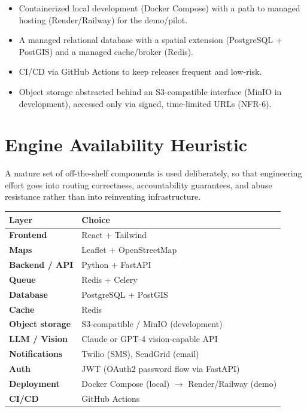 \documentclass[12pt,a4paper]{article}
\begin{document}
\begin{itemize}
    \item Containerized local development (Docker Compose) with a path to managed hosting (Render/Railway) for the demo/pilot.
    \item A managed relational database with a spatial extension (PostgreSQL + PostGIS) and a managed cache/broker (Redis).
    \item CI/CD via GitHub Actions to keep releases frequent and low-risk.
    \item Object storage abstracted behind an S3-compatible interface (MinIO in development), accessed only via signed, time-limited URLs (NFR-6).
\end{itemize}

\section{Engine Availability Heuristic}

A mature set of off-the-shelf components is used deliberately, so that engineering effort goes into routing correctness, accountability guarantees, and abuse resistance rather than into reinventing infrastructure.

\begin{center}
\begin{tabular}{>{\bfseries}p{} p{}}
\toprule
Layer & Choice \\
\midrule
Frontend & React + Tailwind \\
Maps & Leaflet + OpenStreetMap \\
Backend / API & Python + FastAPI \\
Queue & Redis + Celery \\
Database & PostgreSQL + PostGIS \\
Cache & Redis \\
Object storage & S3-compatible / MinIO (development) \\
LLM / Vision & Claude or GPT-4 vision-capable API \\
Notifications & Twilio (SMS), SendGrid (email) \\
Auth & JWT (OAuth2 password flow via FastAPI) \\
Deployment & Docker Compose (local) $\rightarrow$ Render/Railway (demo) \\
CI/CD & GitHub Actions \\
\bottomrule
\end{tabular}
\end{center}
\end{document}
